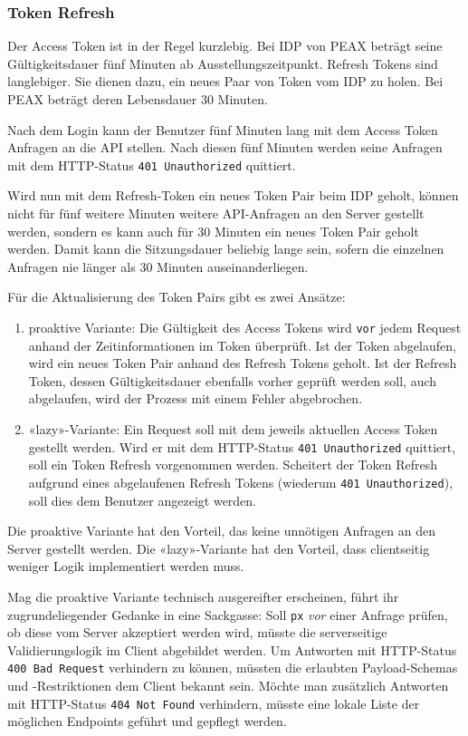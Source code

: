 \subsubsection{Token Refresh}
\label{sec:Token-Refresh}

Der Access Token ist in der Regel kurzlebig. Bei IDP von PEAX beträgt seine Gültigkeitsdauer fünf Minuten ab Ausstellungszeitpunkt. Refresh Tokens sind langlebiger. Sie dienen dazu, ein neues Paar von Token vom IDP zu holen. Bei PEAX beträgt deren Lebensdauer 30 Minuten.

Nach dem Login kann der Benutzer fünf Minuten lang mit dem Access Token Anfragen an die API stellen. Nach diesen fünf Minuten werden seine Anfragen mit dem HTTP-Status \texttt{401 Unauthorized} quittiert.

Wird nun mit dem Refresh-Token ein neues Token Pair beim IDP geholt, können nicht für fünf weitere Minuten weitere API-Anfragen an den Server gestellt werden, sondern es kann auch für 30 Minuten ein neues Token Pair geholt werden. Damit kann die Sitzungsdauer beliebig lange sein, sofern die einzelnen Anfragen nie länger als 30 Minuten auseinanderliegen.

Für die Aktualisierung des Token Pairs gibt es zwei Ansätze:

\begin{enumerate}
    \item proaktive Variante: Die Gültigkeit des Access Tokens wird \texttt{vor} jedem Request anhand der Zeitinformationen im Token überprüft. Ist der Token abgelaufen, wird ein neues Token Pair anhand des Refresh Tokens geholt. Ist der Refresh Token, dessen Gültigkeitsdauer ebenfalls vorher geprüft werden soll,  auch abgelaufen, wird der Prozess mit einem Fehler abgebrochen.
    \item «lazy»-Variante: Ein Request soll mit dem jeweils aktuellen Access Token gestellt werden. Wird er mit dem HTTP-Status \texttt{401 Unauthorized} quittiert, soll ein Token Refresh vorgenommen werden. Scheitert der Token Refresh aufgrund eines abgelaufenen Refresh Tokens (wiederum \texttt{401 Unauthorized}), soll dies dem Benutzer angezeigt werden.
\end{enumerate}

Die proaktive Variante hat den Vorteil, das keine unnötigen Anfragen an den Server gestellt werden. Die «lazy»-Variante hat den Vorteil, dass clientseitig weniger Logik implementiert werden muss.

Mag die proaktive Variante technisch ausgereifter erscheinen, führt ihr zugrundeliegender Gedanke in eine Sackgasse: Soll \texttt{px} \textit{vor} einer Anfrage prüfen, ob diese vom Server akzeptiert werden wird, müsste die serverseitige Validierungslogik im Client abgebildet werden. Um Antworten mit HTTP-Status \texttt{400 Bad Request} verhindern zu können, müssten die erlaubten Payload-Schemas und -Restriktionen dem Client bekannt sein. Möchte man zusätzlich Antworten mit HTTP-Status \texttt{404 Not Found} verhindern, müsste eine lokale Liste der möglichen Endpoints geführt und gepflegt werden.

